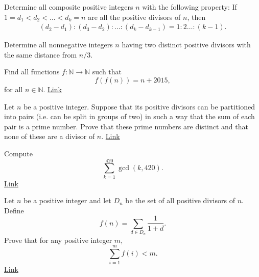 \begin{problem}
	Determine all composite positive integers $n$ with the following property: If $1 = d_1 < d_2 <
	\ldots < d_k = n$ are all the positive divisors of $n$, then
		\begin{align*}
			(d_2-d_1):(d_3-d_2):\dots : (d_k - d_{k-1}) = 1:2\dots :(k-1).
		\end{align*}
\end{problem}



\begin{problem}
	Determine all nonnegative integers $n$ having two distinct positive divisors with the same distance from $n/3$.
\end{problem}


\begin{problem}
	Find all functions $f:\mathbb{N}\to\mathbb{N}$ such that \[f(f(n))=n+2015,\]
	for all $n\in \mathbb{N}.$ \hfill \href{https://artofproblemsolving.com/community/c6h1200797p5903215}{Link}
\end{problem}

\begin{problem}[Benelux]
	Let $n$ be a positive integer. Suppose that its positive divisors can be partitioned into pairs (i.e. can be split in groups of two) in such a way that the sum of each pair is a prime number. Prove that these prime numbers are distinct and that none of these are a divisor of $n.$ \hfill \href{http://artofproblemsolving.com/community/c6h1236282p6284421}{Link}
\end{problem}



\begin{problem}
	Compute \[\sum_{k=1}^{420} \gcd(k,420).\]
	\flushright \href{http://artofproblemsolving.com/community/c4h1249124p6423895}{Link}
\end{problem}



\begin{problem}
	Let $n$ be a positive integer and let $D_n$ be the set of all positive divisors of $n$. Define \[f(n)=\sum\limits_{d\in D_n}{\frac{1}{1+d}}.\]
	Prove that for any positive integer $m$, \[\sum_{i=1}^{m}{f(i)} <m.\]
	\flushright \href{http://artofproblemsolving.com/community/c6h1281358p6741745}{Link}
\end{problem}



